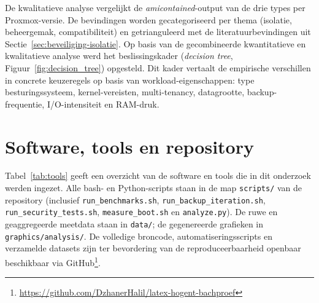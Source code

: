 De kwalitatieve analyse vergelijkt de \textit{amicontained}-output van de drie types per Proxmox-versie. De bevindingen worden gecategoriseerd per thema (isolatie, beheergemak, compatibiliteit) en getrianguleerd met de literatuurbevindingen uit Sectie~\ref{sec:beveiliging-isolatie}. Op basis van de gecombineerde kwantitatieve en kwalitatieve analyse werd het beslissingskader (\textit{decision tree}, Figuur~\ref{fig:decision_tree}) opgesteld. Dit kader vertaalt de empirische verschillen in concrete keuzeregels op basis van workload-eigenschappen: type besturingssysteem, kernel-vereisten, multi-tenancy, datagrootte, backup-frequentie, I/O-intensiteit en RAM-druk.

\section{Software, tools en repository}
\label{sec:software-tools}



Tabel~\ref{tab:tools} geeft een overzicht van de software en tools die in dit onderzoek werden ingezet. Alle bash- en Python-scripts staan in de map \texttt{scripts/} van de repository (inclusief \texttt{run\_benchmarks.sh}, \texttt{run\_backup\_iteration.sh}, \texttt{run\_security\_tests.sh}, \texttt{measure\_boot.sh} en \texttt{analyze.py}). De ruwe en geaggregeerde meetdata staan in \texttt{data/}; de gegenereerde grafieken in \texttt{graphics/analysis/}. De volledige broncode, automatiseringsscripts en verzamelde datasets zijn ter bevordering van de reproduceerbaarheid openbaar beschikbaar via GitHub\footnote{\url{https://github.com/DzhanerHalil/latex-hogent-bachproef}}.

